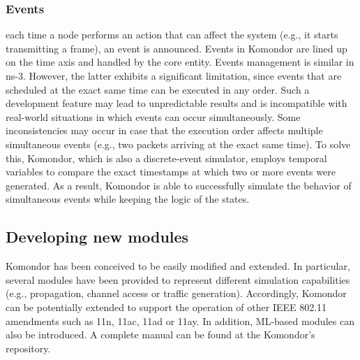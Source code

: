 \documentclass{article}
\begin{document}
	\subsubsection{Events}
	each time a node performs an action that can affect the system (e.g., it starts transmitting a frame), an event is announced. Events in Komondor are lined up on the time axis and handled by the core entity. Events management is similar in ns-3. However, the latter exhibits a significant limitation, since events that are scheduled at the exact same time can be executed in any order. Such a development feature may lead to unpredictable results and is incompatible with real-world situations in which events can occur simultaneously. Some inconsistencies may occur in case that the execution order affects multiple simultaneous events (e.g., two packets arriving at the exact same time). To solve this, Komondor, which is also a discrete-event simulator, employs temporal variables to compare the exact timestamps at which two or more events were generated. As a result, Komondor is able to successfully simulate the behavior of simultaneous events while keeping the logic of the states.
	
	\subsection{Developing new modules}
	
	Komondor has been conceived to be easily modified and extended. In particular, several modules have been provided to represent different simulation capabilities (e.g., propagation, channel access or traffic generation). Accordingly, Komondor can be potentially extended to support the operation of other IEEE 802.11 amendments such as 11n, 11ac, 11ad or 11ay. In addition, ML-based modules can also be introduced. A complete manual can be found at the Komondor's repository.
	
\end{document}
